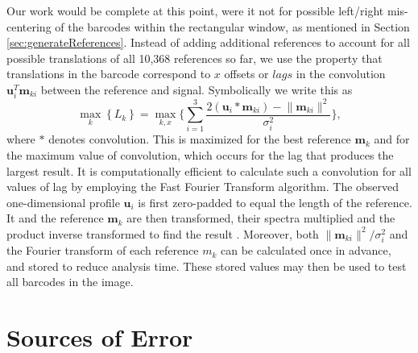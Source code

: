 Our work would be complete at this point, were it not for possible left/right mis-centering of the barcodes within the rectangular window, as mentioned in  Section \ref{sec:generateReferences}. Instead of adding  additional references to account for all possible translations of all 10,368 references so far, we use the property that translations in the barcode correspond to $x$ offsets or $lags$ in the convolution $\mathbf{u}_i ^T \mathbf{m}_{ki}$ between the reference and signal. Symbolically we write this as 
\begin{equation}
\max_k   \left\{ L_k \right\}  =  \max_{k,x} \Bigg\{ \sum_{i=1}^3 \frac{   2 (\mathbf{u}_i * \mathbf{m}_{ki}) - \lVert \mathbf{m}_{ki} \rVert^2   }{\sigma_i^2}  \Bigg\},
\end{equation}
where $*$ denotes convolution. This is maximized for the best reference $\mathbf{m}_k$ and for the maximum value of convolution, which occurs for the lag that produces the largest result.  It is computationally efficient to calculate such a convolution for all values of lag by employing the Fast Fourier Transform algorithm. The observed one-dimensional profile $\mathbf{u}_i$ is first zero-padded to equal the length of the reference. It and the reference $\mathbf{m}_k$ are then transformed, their spectra multiplied and the product inverse transformed to find the result \citep{oppenheim_digital_1975}. Moreover, both  $\lVert \mathbf{m}_{ki} \rVert^2 / \sigma_i^2$ and the Fourier transform of each reference $m_k$ can be calculated once in advance, and stored to reduce analysis time. These stored values may then be used to test all barcodes in the image.  


\section{Sources of Error}

